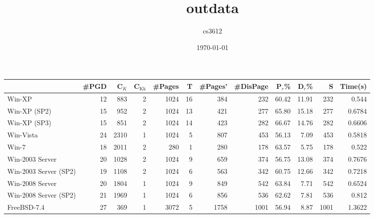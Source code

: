 \documentclass[11pt]{article}
\title{outdata}
\author{cs3612}
\date{\today}
\begin{document}
\maketitle

\setcounter{tocdepth}{3}
\tableofcontents
\vspace*{1cm}

\begin{center}
\begin{tabular}{lrrrrrrrrrrr}
                        &  \#PGD  &   C$_K$  &  C$_{\mathrm{Kk}}$  &  \#Pages  &     T  &  \#Pages'  &  \#DisPage  &  P$_r$\%  &  D$_r$\%  &       S  &  Time(s)  \\
\hline
 Win-XP                 &     12  &     883  &                  2  &     1024  &    16  &       384  &        232  &    60.42  &    11.91  &     232  &    0.544  \\
 Win-XP (SP2)           &     15  &     952  &                  2  &     1024  &    13  &       421  &        277  &    65.80  &    15.18  &     277  &   0.6784  \\
 Win-XP (SP3)           &     15  &     851  &                  2  &     1024  &    14  &       423  &        282  &    66.67  &    14.76  &     282  &   0.6606  \\
 Win-Vista              &     24  &    2310  &                  1  &     1024  &     5  &       807  &        453  &    56.13  &     7.09  &     453  &   0.5818  \\
 Win-7                  &     18  &    2011  &                  2  &      280  &     1  &       280  &        178  &    63.57  &     5.75  &     178  &    0.522  \\
 Win-2003 Server        &     20  &    1028  &                  2  &     1024  &     9  &       659  &        374  &    56.75  &    13.08  &     374  &   0.7676  \\
 Win-2003 Server (SP2)  &     19  &    1108  &                  2  &     1024  &     6  &       563  &        342  &    60.75  &    12.66  &     342  &   0.7218  \\
 Win-2008 Server        &     20  &    1804  &                  1  &     1024  &     9  &       849  &        542  &    63.84  &     7.71  &     542  &   0.6524  \\
 Win-2008 Server (SP2)  &     21  &    1969  &                  1  &     1024  &     6  &       856  &        536  &    62.62  &     7.81  &     536  &    0.812  \\
\hline
\hline
 FreeBSD-7.4            &     27  &     369  &                  1  &     3072  &     5  &      1758  &       1001  &    56.94  &     8.87  &    1001  &   1.3622  \\

\end{tabular}
\end{center}
\end{document}

